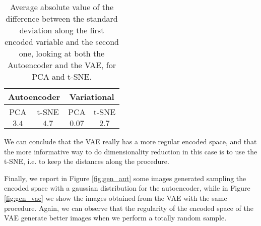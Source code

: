 \begin{table}[h]
    \centering
    \begin{tabular}[h]{|c|c|c|c|}
        \multicolumn{2}{c}{Autoencoder} & \multicolumn{2}{c}{Variational} \\ \hline
        PCA & t-SNE & PCA & t-SNE \\ \hline
        $3.4$ & $4.7$ & $0.07$ & $2.7$ \\ \hline
    \end{tabular}
    \caption{Average absolute value of the difference between the standard deviation along the first encoded
    variable and the second one, looking at both the Autoencoder and the VAE, for PCA and t-SNE.}
    \label{tab:diff}
\end{table}

We can conclude that the VAE really has a more regular encoded space, and that the more informative way to do dimensionality reduction in this case is to use the t-SNE, i.e. to keep 
the distances along the procedure.

Finally, we report in Figure \ref{fig:gen_aut} some images generated sampling the encoded space with a gaussian distribution for the autoencoder, while in Figure \ref{fig:gen_vae} 
we show the images obtained from the VAE with the same procedure. Again, we can observe that the regularity of the encoded space of the VAE generate better images when we perform
a totally random sample.